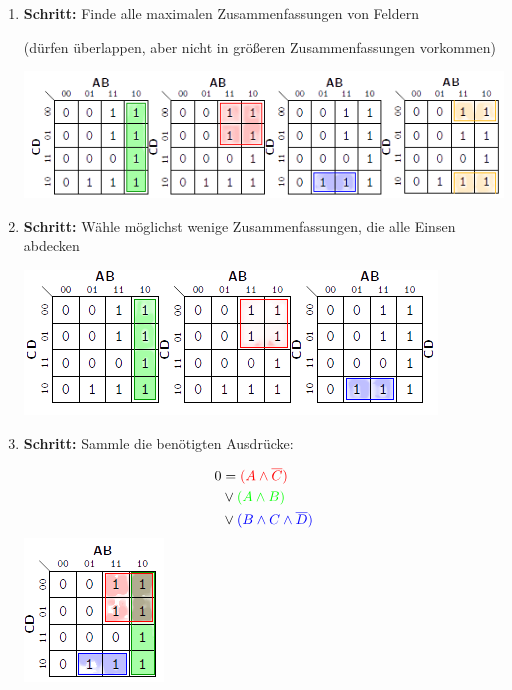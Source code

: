 \documentclass[12pt]{report}
\begin{document}
\begin{enumerate}
  \item \textbf{Schritt:}
        Finde alle maximalen Zusammenfassungen von Feldern

        (dürfen überlappen, aber nicht in größeren Zusammenfassungen vorkommen)

        \begin{center}
          \includegraphics[scale=1]{karnaugh-veitch-step_01}
        \end{center}


  \item \textbf{Schritt:}
        Wähle möglichst wenige Zusammenfassungen, die alle Einsen abdecken

        \begin{center}
          \includegraphics[scale=1]{karnaugh-veitch-step_02}
        \end{center}


  \item \textbf{Schritt:}
        Sammle die benötigten Ausdrücke:
        \begin{multicols}{2}
          \begin{align*}
            0 & = \color{red}{(A \wedge \overline{C})}              \\
              & \vee \color{green}{(A \wedge B)}                    \\
              & \vee \color{blue}{(B \wedge C \wedge \overline{D})}
          \end{align*}
          \columnbreak
          \includegraphics[scale=1]{karnaugh-veitch-step_03}
        \end{multicols}
\end{enumerate}
\end{document}

